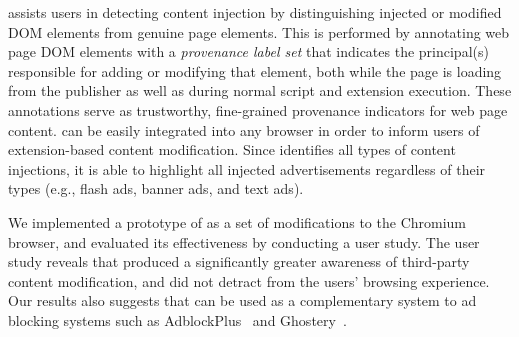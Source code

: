 \origintracer assists users in detecting content injection by distinguishing
injected or modified DOM elements from genuine page elements. This is performed
by annotating web page DOM elements with a \emph{provenance label set} that
indicates the principal(s) responsible for adding or modifying that element,
both while the page is loading from the publisher as well as during normal
script and extension execution. These annotations serve as trustworthy,
fine-grained provenance indicators for web page content. \origintracer can be
easily integrated into any browser in order to inform users of extension-based
content modification. Since \origintracer identifies all types of content
injections, it is able to highlight all injected advertisements regardless of
their types (e.g., flash ads, banner ads, and text ads).

We implemented a prototype of \origintracer as a set of modifications to the
Chromium browser, and evaluated its effectiveness by conducting a user study.
The user study reveals that \origintracer produced a significantly greater
awareness of third-party content modification, and did not detract from the
users' browsing experience. Our results also suggests that \origintracer can be
used as a complementary system to ad blocking systems such as
AdblockPlus~\cite{adblockplus} and Ghostery~\cite{ghostery}.

